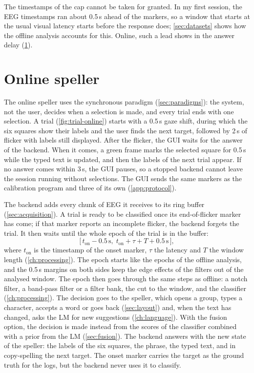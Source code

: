 The timestamps of the cap cannot be taken for granted. In my first session, the
\ac{EEG} timestamps ran about 0.5\,s ahead of the markers, so a window that starts at
the usual visual latency starts before the response does; \cref{sec:datasets} shows
how the offline analysis accounts for this. Online, such a lead shows in the answer
delay (\cref{sec:online}).

\section{Online speller}
\label{sec:online}

The online speller uses the synchronous paradigm (\cref{sec:paradigms}): the system,
not the user, decides when a selection is made, and every trial ends with one
selection. A trial (\cref{fig:trial-online}) starts with a 0.5\,s gaze shift, during
which the six squares show their labels and the user finds the next target, followed
by 2\,s of flicker with labels still displayed. After the flicker, the \ac{GUI} waits for the
answer of the backend. When it comes, a green frame marks the selected square for
0.5\,s while the typed text is updated, and then the labels of the next trial appear.
If no answer comes within 3\,s, the \ac{GUI} pauses, so a stopped backend cannot leave
the session running without selections. The \ac{GUI} sends the same markers as the
calibration program and three of its own (\cref{app:protocol}).

The backend adds every chunk of \ac{EEG} it receives to its ring buffer
(\cref{sec:acquisition}). A trial is ready to be classified once its end-of-flicker
marker has come; if that marker reports an incomplete flicker, the backend forgets the
trial. It then waits until the whole epoch of the trial is in the buffer:
\begin{equation}
  \bigl[\,t_\mathrm{on} - 0.5\,\mathrm{s},\;
    t_\mathrm{on} + \tau + T + 0.5\,\mathrm{s}\,\bigr],
  \label{eq:online-epoch}
\end{equation}
where $t_\mathrm{on}$ is the timestamp of the onset marker, $\tau$ the latency and $T$
the window length (\cref{ch:processing}). The epoch starts like the epochs of the
offline analysis, and the 0.5\,s margins on both sides keep the edge effects of the
filters out of the analysed window. The epoch then goes through the same steps as
offline: a notch filter, a band-pass filter or a filter bank, the cut to the window,
and the classifier (\cref{ch:processing}). The decision goes to the speller, which
opens a group, types a character, accepts a word or goes back (\cref{sec:layout}) and,
when the text has changed, asks the \ac{LM} for new suggestions (\cref{ch:language}).
With the fusion option, the decision is made instead from the scores of the classifier
combined with a prior from the \ac{LM} (\cref{sec:fusion}). The backend answers with
the new state of the speller: the labels of the six squares, the phrase, the typed
text, and in copy-spelling the next target. The onset marker carries the target as
the ground truth for the logs, but the backend never uses it to classify.

